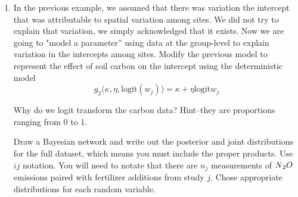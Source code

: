 \documentclass[12pt, oneside]{article}
\begin{document}
\begin{enumerate} [leftmargin=*]
\newpage
\item In the previous example, we assumed that there was variation the intercept that was attributable to spatial variation among sites. We did not try to explain that variation, we simply acknowledged that it exists. Now we are going to "model a parameter'' using data at the group-level to explain variation in the intercepts among sites. Modify the previous model to represent the effect of soil carbon on the intercept using the deterministic model $$g_2\big(\kappa,\eta,\text{logit}(w_j)\big)  =\kappa + \eta \text{logit}w_j$$

Why do we logit transform the carbon data? Hint--they are proportions ranging from 0 to 1.


Draw a Bayesian network and write out the posterior and joint distributions for the full dataset, which means you must include the proper products. Use $ij$ notation. You will need to notate that there are $n_{j}$ measurements of {$N\textsubscript{2}O$ emissions paired with fertilizer additions} from study $j$. Chose appropriate distributions for each random variable.


\end{enumerate}
\end{document}

